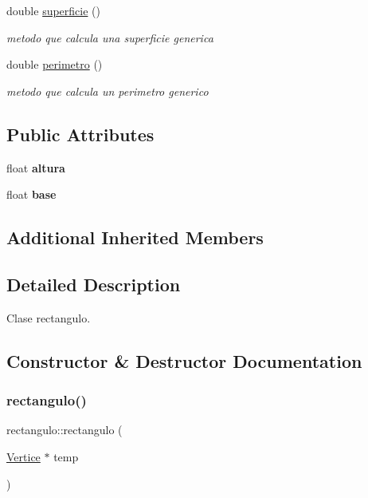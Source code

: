 \begin{DoxyCompactItemize}
double \hyperlink{classrectangulo_ab0db7c753485200cf2577532af506426}{superficie} ()
\begin{DoxyCompactList}\small\item\em metodo que calcula una superficie generica \end{DoxyCompactList}\item 
\mbox{\label{classrectangulo_a23a8d0d8a593f80776b4629c6dc435e0}} 
double \hyperlink{classrectangulo_a23a8d0d8a593f80776b4629c6dc435e0}{perimetro} ()
\begin{DoxyCompactList}\small\item\em metodo que calcula un perimetro generico \end{DoxyCompactList}\end{DoxyCompactItemize}
\subsection*{Public Attributes}
\begin{DoxyCompactItemize}
\item 
\mbox{\label{classrectangulo_a4793bfe1636488ed8344a82a271dcd8d}} 
float {\bfseries altura}
\item 
\mbox{\label{classrectangulo_a0f5bab44f86d9b58bd1c4710f3e001b5}} 
float {\bfseries base}
\end{DoxyCompactItemize}
\subsection*{Additional Inherited Members}


\subsection{Detailed Description}
Clase rectangulo. 

\subsection{Constructor \& Destructor Documentation}
\mbox{\label{classrectangulo_aa785cc2d5bd4cbae7dab1912afba62a7}} 
\subsubsection{\texorpdfstring{rectangulo()}{rectangulo()}}
{\footnotesize\ttfamily rectangulo\+::rectangulo (\begin{DoxyParamCaption}\item[{\hyperlink{class_vertice}{Vertice} $\ast$}]{temp }\end{DoxyParamCaption})}



